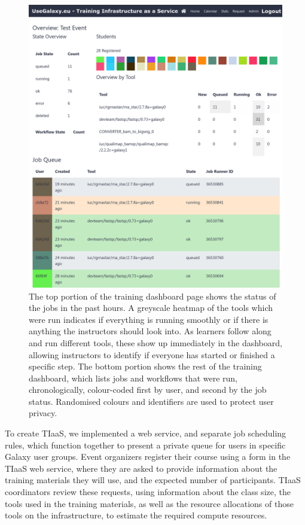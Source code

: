 \documentclass[a4paper,num-refs]{oup-contemporary}
\begin{document}
\begin{figure}[bt!]
\centering
\includegraphics[width=\linewidth]{images/dashboard.png}
\caption{The top portion of the training dashboard page shows the status of the jobs in the past hours. A greyscale heatmap of the tools which were run indicates if everything is running smoothly or if there is anything the instructors should look into. As learners follow along and run different tools, these show up immediately in the dashboard, allowing instructors to identify if everyone has started or finished a specific step. The bottom portion shows the rest of the training dashboard, which lists jobs and workflows that were run, chronologically, colour-coded first by user, and second by the job status. Randomised colours and identifiers are used to protect user privacy.}\label{figure:dashboard}
\end{figure}

To create TIaaS, we implemented a web service, and separate job scheduling rules, which function together to present a private queue for users in specific Galaxy user groups. Event organizers register their course using a form in the TIaaS web service, where they are asked to provide information about the training  materials they will use, and the expected number of participants. TIaaS coordinators  review these requests, using information about the class size, the tools used in the training materials, as well as the resource allocations of those tools on the infrastructure, to estimate the required compute resources.
\end{document}

